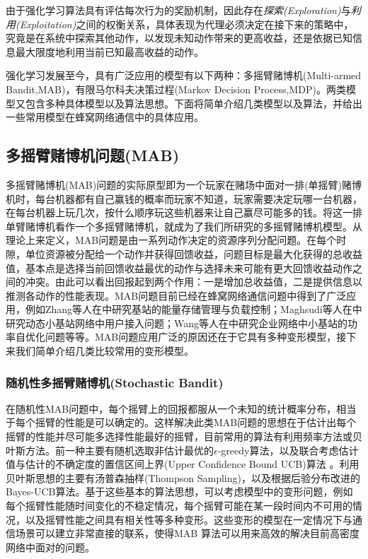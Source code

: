 ﻿\documentclass[11pt,draftclsnofoot,onecolumn,journal,letterpaper]{IEEEtran}
\begin{document}
由于强化学习算法具有评估每次行为的奖励机制，因此存在\emph{探索(Exploration)}与\emph{利用(Exploitation)}之间的权衡关系，具体表现为代理必须决定在接下来的策略中，究竟是在系统中探索其他动作，以发现未知动作带来的更高收益，还是依据已知信息最大限度地利用当前已知最高收益的动作。

强化学习发展至今，具有广泛应用的模型有以下两种：多摇臂赌博机(Multi-armed Bandit,MAB)，有限马尔科夫决策过程(Markov Decision Process,MDP)。两类模型又包含多种具体模型以及算法思想。下面将简单介绍几类模型以及算法，并给出一些常用模型在蜂窝网络通信中的具体应用。


\subsection{多摇臂赌博机问题(MAB)}
多摇臂赌博机(MAB)问题的实际原型即为一个玩家在赌场中面对一排(单摇臂)赌博机时，每台机器都有自己赢钱的概率而玩家不知道，玩家需要决定玩哪一台机器，在每台机器上玩几次，按什么顺序玩这些机器来让自己赢尽可能多的钱。将这一排单臂赌博机看作一个多摇臂赌博机，就成为了我们所研究的多摇臂赌博机模型。从理论上来定义，MAB问题是由一系列动作决定的资源序列分配问题。在每个时隙，单位资源被分配给一个动作并获得回馈收益，问题目标是最大化获得的总收益值，基本点是选择当前回馈收益最优的动作与选择未来可能有更大回馈收益动作之间的冲突。由此可以看出回报起到两个作用：一是增加总收益值，二是提供信息以推测各动作的性能表现。MAB问题目前已经在蜂窝网络通信问题中得到了广泛应用，例如Zhang等人在\cite{Zhang2017}中研究基站的能量存储管理与负载控制；Maghsudi等人在\cite{Maghsudi2017}中研究动态小基站网络中用户接入问题；Wang等人在\cite{Wang2017}中研究企业网络中小基站的功率自优化问题等等。MAB问题应用广泛的原因还在于它具有多种变形模型，接下来我们简单介绍几类比较常用的变形模型。
\subsubsection{随机性多摇臂赌博机(Stochastic Bandit)}
在随机性MAB问题中，每个摇臂上的回报都服从一个未知的统计概率分布，相当于每个摇臂的性能是可以确定的。这样解决此类MAB问题的思想在于估计出每个摇臂的性能并尽可能多选择性能最好的摇臂，目前常用的算法有利用频率方法或贝叶斯方法。前一种主要有随机选取非估计最优的$\epsilon$-greedy算法\cite{Sutton2016}，以及联合考虑估计值与估计的不确定度的置信区间上界(Upper Confidence Bound UCB)算法       \cite{Auer2002a}。利用贝叶斯思想的主要有汤普森抽样(Thompson Sampling)\cite{Agrawal2012}\cite{Kaufmann2012}，以及根据后验分布改进的Bayes-UCB算法\cite{Kaufmann2012a}。基于这些基本的算法思想，可以考虑模型中的变形问题，例如每个摇臂性能随时间变化的不稳定情况，每个摇臂可能在某一段时间内不可用的情况，以及摇臂性能之间具有相关性等多种变形。这些变形的模型在一定情况下与通信场景可以建立非常直接的联系，使得MAB 算法可以用来高效的解决目前高密度网络中面对的问题。
\end{document}
